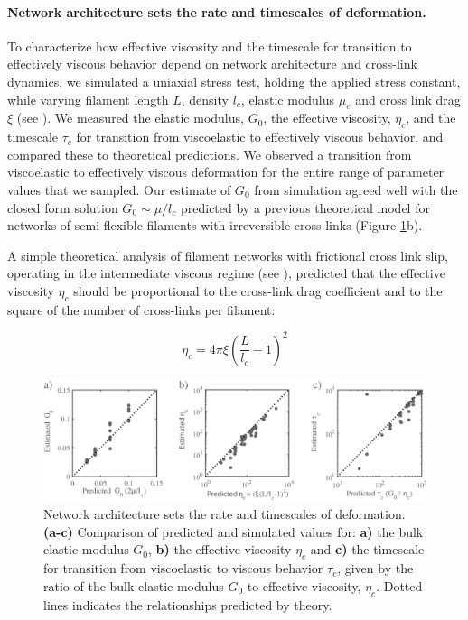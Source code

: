 \documentclass[10pt,letterpaper]{article}
\begin{document}
\paragraph{Network architecture sets the rate and timescales of deformation.}  To characterize how effective viscosity and the timescale for transition to effectively viscous behavior depend on network architecture and cross-link dynamics, we simulated a uniaxial stress test, holding the applied stress constant, while varying filament length $L$, density $l_c$,  elastic modulus $\mu_e$ and cross link drag $\xi$ (see ). We measured the elastic modulus, $G_0$, the effective viscosity, $\eta_c$, and the timescale $\tau_c$ for transition from viscoelastic to effectively viscous behavior, and compared these to theoretical predictions. We observed a transition from viscoelastic to effectively viscous deformation for the entire range of parameter values that we sampled.  Our estimate of $G_0$ from simulation agreed well with the closed form solution  $G_0 \sim \mu/l_c$ predicted by a previous theoretical model \cite{theo_hlm} for networks of semi-flexible filaments with irreversible cross-links (Figure \ref{fig:passive_form}b). 

A simple theoretical analysis of filament networks with frictional cross link slip, operating in the intermediate viscous regime (see ), predicted that the effective viscosity $\eta_c$ should be proportional to the cross-link drag coefficient and to the square of the number of cross-links per filament:

\begin{equation}
\eta_c = 4\pi\xi\left ( \frac{L}{l_c}-1\right )^2
\end{equation}


\begin{figure}[h!]
\centering
\includegraphics[width=\hsize]{figures/figure3}
\caption{\label{fig:passive_form} Network architecture sets the rate and timescales of deformation.  \textbf{(a-c)} Comparison of predicted and simulated values for: \textbf{a)} the bulk elastic modulus $G_0$,  \textbf{b)} the effective viscosity $\eta_c$ and \textbf{c)} the timescale for transition from viscoelastic to viscous behavior $\tau_c$, given by the ratio of the bulk elastic modulus $G_0$ to effective viscosity, $\eta_c$. Dotted lines indicates the relationships predicted by theory. }
\end{figure}
\end{document}

